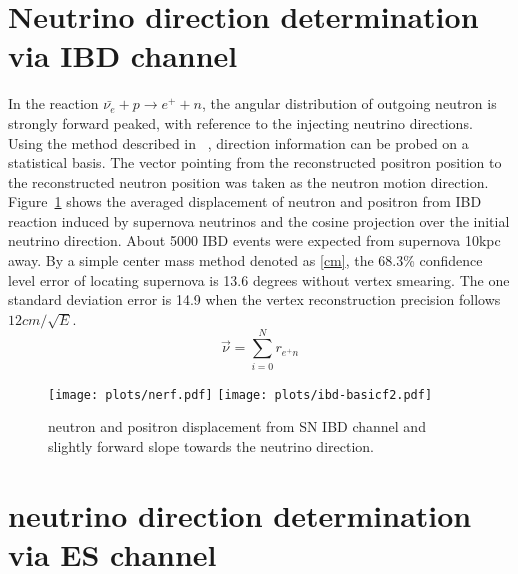 \documentclass[a4paper,10pt]{cpc-hepnp}
\begin{document}
\section{ Neutrino direction determination via IBD channel}
\label{sec:intro}
In the reaction $\bar{\nu_{e}}+p \rightarrow e^{+}+n$, the
angular distribution of outgoing neutron is strongly forward peaked, with
reference to the injecting neutrino directions. Using the method described in
~\cite{chooz}, direction information can be probed on a  statistical basis.
The vector pointing from the reconstructed positron position to the
reconstructed neutron position was taken as the neutron motion direction.
Figure~\ref{ibd-basicplot} shows the averaged displacement of neutron and
positron from IBD reaction induced by supernova neutrinos and the cosine
projection over the initial neutrino direction. About 5000 IBD events were expected from
supernova 10kpc away. By a simple center mass method denoted as \eqref{cm},
the 68.3\% confidence level error of locating supernova is 13.6 degrees without
vertex smearing. The one standard deviation error is 14.9 when the vertex
reconstruction precision follows $12cm/\sqrt{E}$.
\begin{equation}
\label{cm}
\vec{\nu} = \sum_{i=0}^{N}r_{e^{+}n}
\end{equation}

\begin{figure}[htbp]
\centering %
\texttt{[image: plots/nerf.pdf]}
\hfill
\texttt{[image: plots/ibd-basicf2.pdf]}
\caption{\label{ibd-basicplot} neutron and positron displacement from SN IBD
channel and slightly forward slope towards the neutrino direction.}
\end{figure}
\section{neutrino direction determination via ES channel}
\end{document}
